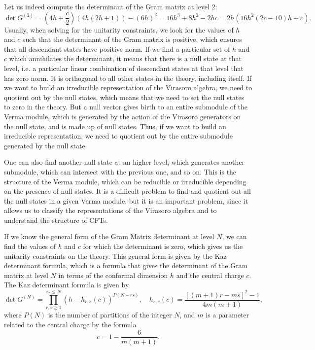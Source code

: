 Let us indeed compute the determinant of the Gram matrix at level 2:
\[
    \det G^{(2)} = (4h + \frac{c}{2})(4h(2h + 1)) - (6h)^2 = 16 h^3 + 8 h^2 - 2 h c = 2h (16h^2 (2c-10)h + c).
\]
Usually, when solving for the unitarity constraints, we look for the values of \(h\) and \(c\) such that the determinant of the Gram matrix is positive, which ensures that all descendant states have positive norm. If we find a particular set of \(h\) and \(c\) which annihilates the determinant, it means that there is a null state at that level, i.e. a particular linear combination of descendant states at that level that has zero norm. It is orthogonal to all other states in the theory, including itself. If we want to build an irreducible representation of the Virasoro algebra, we need to quotient out by the null states, which means that we need to set the null states to zero in the theory. But a null vector gives birth to an entire submodule of the Verma module, which is generated by the action of the Virasoro generators on the null state, and is made up of null states. Thus, if we want to build an irreducible representation, we need to quotient out by the entire submodule generated by the null state.

One can also find another null state at an higher level, which generates another submodule, which can intersect with the previous one, and so on. This is the structure of the Verma module, which can be reducible or irreducible depending on the presence of null states. It is a difficult problem to find and quotient out all the null states in a given Verma module, but it is an important problem, since it allows us to classify the representations of the Virasoro algebra and to understand the structure of CFTs.

If we know the general form of the Gram Matrix determinant at level \(N\), we can find the values of \(h\) and \(c\) for which the determinant is zero, which gives us the unitarity constraints on the theory. This general form is given by the Kaz determinant formula, which is a formula that gives the determinant of the Gram matrix at level \(N\) in terms of the conformal dimension \(h\) and the central charge \(c\). The Kaz determinant formula is given by
\[
    \det G^{(N)} = \prod_{r,s \geq 1}^{rs\leq N} (h - h_{r,s}(c))^{P(N-rs)}, \quad h_{r,s}(c) = \frac{[(m+1)r - ms]^2-1}{4m(m+1)},
\]
where \(P(N)\) is the number of partitions of the integer \(N\), and \(m\) is a parameter related to the central charge by the formula
\[
    c = 1 - \frac{6}{m(m+1)}.
\]

